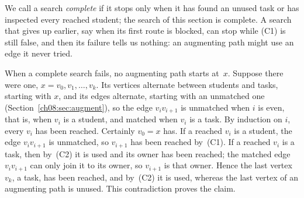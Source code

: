 We call a search \emph{complete} if it stops only when it has found an unused task or has inspected every reached student; the search of this section is complete. A search that gives up earlier, say when its first route is blocked, can stop while (C1) is still false, and then its failure tells us nothing: an augmenting path might use an edge it never tried.

When a complete search fails, no augmenting path starts at~$x$. Suppose there were one, $x=v_0,v_1,\ldots,v_k$. Its vertices alternate between students and tasks, starting with $x$, and its edges alternate, starting with an unmatched one (Section~\ref{ch08:sec:augment}), so the edge $v_iv_{i+1}$ is unmatched when $i$ is even, that is, when $v_i$ is a student, and matched when $v_i$ is a task. By induction on $i$, every $v_i$ has been reached. Certainly $v_0=x$ has. If a reached $v_i$ is a student, the edge $v_iv_{i+1}$ is unmatched, so $v_{i+1}$ has been reached by~(C1). If a reached $v_i$ is a task, then by~(C2) it is used and its owner has been reached; the matched edge $v_iv_{i+1}$ can only join it to its owner, so $v_{i+1}$ is that owner. Hence the last vertex $v_k$, a task, has been reached, and by~(C2) it is used, whereas the last vertex of an augmenting path is unused. This contradiction proves the claim.
